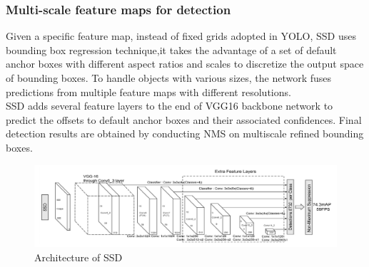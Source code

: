         \subsubsection{Multi-scale feature maps for detection}
            Given a specific feature map, instead of fixed grids adopted in YOLO, SSD uses bounding box regression technique,it takes the advantage of a set of default anchor boxes with different aspect ratios and scales to discretize the output space of bounding boxes. To handle objects with various sizes, the network fuses predictions from multiple feature maps with different resolutions. \\ 
            \vspace{3mm}
            SSD adds several feature layers to the end of VGG16 backbone network to predict the offsets to default anchor boxes and their associated confidences. Final detection results are obtained by conducting NMS on multiscale refined bounding boxes.
            \begin{figure}[H]
                \centering
                \includegraphics[width=0.6\linewidth]{img/ssd.png}
                \caption{Architecture of SSD}
            \end{figure}
